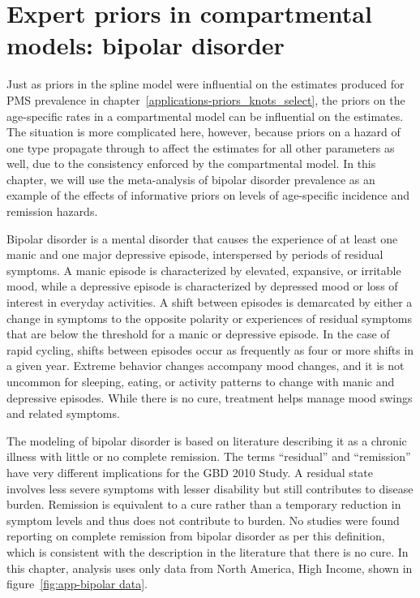 \chapter{Expert priors in compartmental models: bipolar disorder}
\label{applications-prior_level_vals}

Just as priors in the spline model were influential on the estimates
produced for PMS prevalence in
chapter~\ref{applications-priors_knots_select}, the priors on the
age-specific rates in a compartmental model can be influential on the
estimates.  The situation is more complicated here, however, because
priors on a hazard of one type propagate through to affect the
estimates for all other parameters as well, due to the consistency
enforced by the compartmental model.  In this chapter, we will use the
meta-analysis of bipolar disorder prevalence as an example of the
effects of informative priors on levels of age-specific incidence and
remission hazards.

Bipolar disorder is a mental disorder that causes the experience
of at least one manic and one major depressive episode,
interspersed by periods of residual symptoms.  A manic episode is
characterized by elevated, expansive, or irritable mood, while a
depressive episode is characterized by depressed mood or loss of
interest in everyday activities.  A shift between episodes is
demarcated by either a change in symptoms to the opposite polarity
or experiences of residual symptoms that are below the threshold
for a manic or depressive episode.  In the case of rapid cycling,
shifts between episodes occur as frequently as four or more shifts
in a given year.  Extreme behavior
changes accompany mood changes, and it is not uncommon for sleeping,
eating, or activity patterns to change with manic and depressive
episodes.
While there
is no cure, treatment helps manage mood swings and related
symptoms. \cite{kloos_bipolar_2011, angst_historical_2000, TK_coauthor_ref}

The modeling of bipolar disorder is based on literature describing it
as a chronic illness with little or no complete remission.
The terms ``residual'' and ``remission'' have very different implications
for the GBD 2010 Study.  A residual state involves less severe
symptoms with lesser disability but still contributes to disease
burden.  Remission is equivalent to a cure rather than a temporary
reduction in symptom levels and thus does not contribute to burden.  No studies
were found reporting on complete remission from bipolar disorder as per this definition,
which is consistent with the description in the literature that there
is no cure. \cite{american_psychiatric_association_diagnostic_2000}
In this chapter, analysis
uses only data from  North America, High Income,
shown in figure~\ref{fig:app-bipolar data}.

